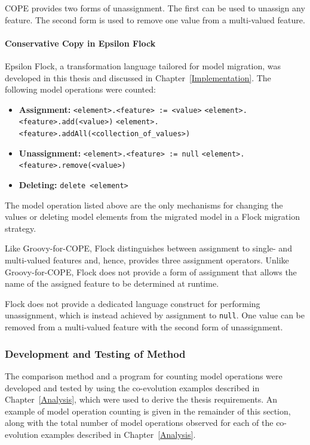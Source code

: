 COPE provides two forms of unassignment. The first can be used to unassign any feature. The second form is used to remove one value from a multi-valued feature.


\paragraph{Conservative Copy in Epsilon Flock}
Epsilon Flock, a transformation language tailored for model migration, was developed in this thesis and discussed in Chapter~\ref{Implementation}. The following model operations were counted:

\begin{itemize}
	\item \textbf{Assignment:}
	\subitem \texttt{<element>.<feature> := <value>} 
	\subitem \texttt{<element>.<feature>.add(<value>)}
	\subitem \texttt{<element>.<feature>.addAll(<collection\_of\_values>)}
	
	\item \textbf{Unassignment:}
	\subitem \texttt{<element>.<feature> := null}
	\subitem \texttt{<element>.<feature>.remove(<value>)}
	
	\item \textbf{Deleting:}
	\subitem \texttt{delete <element>}
\end{itemize}

The model operation listed above are the only mechanisms for changing the values or deleting model elements from the migrated model in a Flock migration strategy.

Like Groovy-for-COPE, Flock distinguishes between assignment to single- and multi-valued features and, hence, provides three assignment operators. Unlike Groovy-for-COPE, Flock does not provide a form of assignment that allows the name of the assigned feature to be determined at runtime.

Flock does not provide a dedicated language construct for performing unassignment, which is instead achieved by assignment to \texttt{null}. One value can be removed from a multi-valued feature with the second form of unassignment.


\subsubsection{Development and Testing of Method}
\label{subsubsec:quantitive_method_development}
The comparison method and a program for counting model operations were developed and tested by using the co-evolution examples described in Chapter~\ref{Analysis}, which were used to derive the thesis requirements. An example of model operation counting is given in the remainder of this section, along with the total number of model operations observed for each of the co-evolution examples described in Chapter~\ref{Analysis}.

